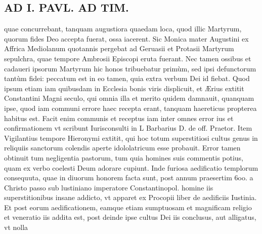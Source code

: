 \documentclass{article}
\begin{document}
\begin{pages}
\section*{AD I. PAVL. AD TIM. }
\marginpar{[ p.70 ]}\pstart quae concurrebant, tanquam augustiora quaedam loca, quod illic Martyrum, quorum fides Deo accepta fuerat, ossa iacerent. Sic Monica mater Augustini ex Affrica Mediolanum quotannis pergebat ad Geruasii et Protasii Martyrum sepulchra, quae tempore Ambrosii Episcopi eruta fuerant. Nec tamen ossibus et cadaueri ipsorum Martyrum hic honos tribuebatur primùm, sed ipsi defunctorum tantùm fidei: peccatum est in eo tamen, quia extra verbum Dei id fiebat. Quod ipsum etiam iam quibusdam in Ecclesia bonis viris displicuit, et Ærius extitit Constantini Magni seculo, qui omnia illa et merito quidem damnauit, quanquam ipse, quod iam communi errore haec recepta erant, tanquam haereticus propterea habitus est. Facit enim communis et receptus iam inter omnes error ius et confirmationem vt scribunt Iurisconsulti in L Barbarius D. de off. Praetor. Item Vigilantius tempore Hieronymi extitit, qui hoc totum superstitiosi cultus genus in reliquiis sanctorum colendis aperte idololatricum esse probauit. Error tamen obtinuit tum negligentia pastorum, tum quia homines suis commentis potius, quam ex verbo coelesti Deum adorare cupiunt. Inde furiosa aedificatio templorum consequuta, quae in diuorum honorem facta sunt, post annum praesertim 6oo. a Christo passo sub lustiniano imperatore Constantinopol. homine iis superstitionibus insane addicto, vt apparet ex Procopii liber  de aedificiis Iustinia. Et post eorum aedificationem, eamque etiam sumptuosam et magnificam religio et veneratio iis addita est, post deinde ipse cultus Dei iis conclusus, aut alligatus, vt nolla  \pend

\end{pages}
\end{document}
